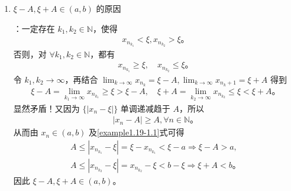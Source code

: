 \documentclass[../../main.tex]{subfiles}
\begin{document}
\begin{remark}
\begin{enumerate}[(1)]
\item \hypertarget{xi-A,xi+A在(a,b)中的原因证明}{$\xi - A, \xi + A \in (a, b)$ 的原因}：一定存在 $k_1, k_2 \in \mathbb{N}$，使得
\begin{align}
x_{n_{k_1}} < \xi, x_{n_{k_2}} > \xi。 \label{example1.19-1.1}
\end{align}
否则，对 $\forall k_1, k_2 \in \mathbb{N}$，都有
\begin{align*}
x_{n_{k_1}} \geqslant \xi, \quad x_{n_{k_2}} \leqslant \xi。
\end{align*}
令 $k_1, k_2 \to \infty$，再结合 $\lim_{k \to \infty} x_{n_k} = \xi - A, \lim_{k \to \infty} x_{n_k+1} = \xi + A$ 得到
\begin{align*}
\xi - A = \lim_{k_1 \to \infty} x_{n_{k_1}} \geqslant \xi > \xi - A, \quad \xi + A = \lim_{k_2 \to \infty} x_{n_{k_2}} \leqslant \xi < \xi + A。
\end{align*}
显然矛盾！又因为 $\{|x_n - \xi|\}$ 单调递减趋于 $A$，所以
\begin{align*}
|x_n - A| \geqslant A, \forall n \in \mathbb{N}。
\end{align*}
从而由 $x_n \in (a, b)$ 及\eqref{example1.19-1.1}式可得
\begin{align*}
A \leqslant |x_{n_{k_1}} - \xi| = \xi - x_{n_{k_1}} < \xi - a \Rightarrow \xi - A > a,
\\
A \leqslant |x_{n_{k_2}} - \xi| = x_{n_{k_2}} - \xi < b - \xi \Rightarrow \xi + A < b。
\end{align*}
因此 $\xi - A, \xi + A \in (a, b)$。
\end{enumerate}
\end{remark}
\end{document}
